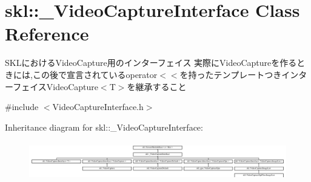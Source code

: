 \hypertarget{classskl_1_1___video_capture_interface}{}\section{skl\+:\+:\+\_\+\+Video\+Capture\+Interface Class Reference}
\label{classskl_1_1___video_capture_interface}


S\+K\+Lにおける\+Video\+Capture用のインターフェイス  実際に\+Video\+Captureを作るときには,この後で宣言されているoperator$<$$<$を持ったテンプレートつきインターフェイス\+Video\+Capture$<$\+T$>$を継承すること  




{\ttfamily \#include $<$Video\+Capture\+Interface.\+h$>$}

Inheritance diagram for skl\+:\+:\+\_\+\+Video\+Capture\+Interface\+:\begin{figure}[H]
\begin{center}
\leavevmode
\includegraphics[height=1.733746cm]{classskl_1_1___video_capture_interface}
\end{center}
\end{figure}
